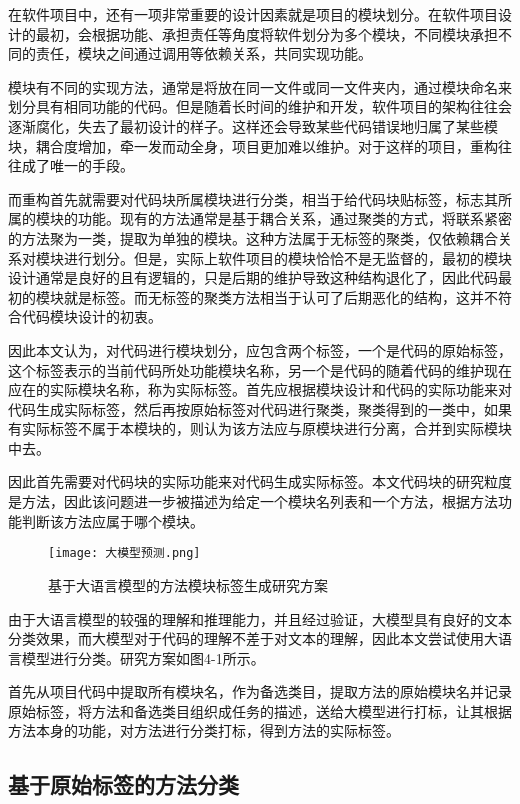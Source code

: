 在软件项目中，还有一项非常重要的设计因素就是项目的模块划分。在软件项目设计的最初，会根据功能、承担责任等角度将软件划分为多个模块，不同模块承担不同的责任，模块之间通过调用等依赖关系，共同实现功能。

模块有不同的实现方法，通常是将放在同一文件或同一文件夹内，通过模块命名来划分具有相同功能的代码。但是随着长时间的维护和开发，软件项目的架构往往会逐渐腐化，失去了最初设计的样子。这样还会导致某些代码错误地归属了某些模块，耦合度增加，牵一发而动全身，项目更加难以维护。对于这样的项目，重构往往成了唯一的手段。

而重构首先就需要对代码块所属模块进行分类，相当于给代码块贴标签，标志其所属的模块的功能。现有的方法通常是基于耦合关系，通过聚类的方式\cite{2017Extraction}，将联系紧密的方法聚为一类，提取为单独的模块。这种方法属于无标签的聚类，仅依赖耦合关系对模块进行划分。但是，实际上软件项目的模块恰恰不是无监督的，最初的模块设计通常是良好的且有逻辑的，只是后期的维护导致这种结构退化了，因此代码最初的模块就是标签。而无标签的聚类方法相当于认可了后期恶化的结构，这并不符合代码模块设计的初衷。

因此本文认为，对代码进行模块划分，应包含两个标签，一个是代码的原始标签，这个标签表示的当前代码所处功能模块名称，另一个是代码的随着代码的维护现在应在的实际模块名称，称为实际标签。首先应根据模块设计和代码的实际功能来对代码生成实际标签，然后再按原始标签对代码进行聚类，聚类得到的一类中，如果有实际标签不属于本模块的，则认为该方法应与原模块进行分离，合并到实际模块中去。

因此首先需要对代码块的实际功能来对代码生成实际标签。本文代码块的研究粒度是方法，因此该问题进一步被描述为给定一个模块名列表和一个方法，根据方法功能判断该方法应属于哪个模块。

\begin{figure}[h]
    \centering
    \texttt{[image: 大模型预测.png]}
    \caption{基于大语言模型的方法模块标签生成研究方案}
    \end{figure}

由于大语言模型的较强的理解和推理能力，并且经过验证，大模型具有良好的文本分类效果\cite{wan-etal-2023-gpt}，而大模型对于代码的理解不差于对文本的理解，因此本文尝试使用大语言模型进行分类。研究方案如图4-1所示。


首先从项目代码中提取所有模块名，作为备选类目，提取方法的原始模块名并记录原始标签，将方法和备选类目组织成任务的描述，送给大模型进行打标，让其根据方法本身的功能，对方法进行分类打标，得到方法的实际标签。


\subsection{基于原始标签的方法分类}

